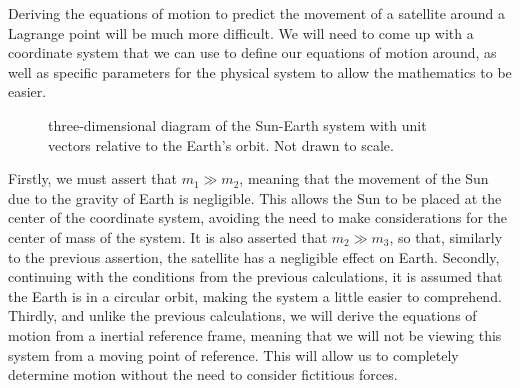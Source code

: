 \documentclass[12pt]{article}
\DeclareRobustCommand{\uvec}[1]{{%
		\ifcat\relax\noexpand#1%
		\bm{\hat{#1}}%
		\else
		\ifcsname uvec#1\endcsname
		\csname uvec#1\endcsname
		\else
		\bm{\hat{\mathbf{#1}}}%
		\fi
		\fi
}}
\newcommand{\bvec}[1]{\bm{\mathbf{#1}}}
\begin{document}
	Deriving the equations of motion to predict the movement of a satellite around a Lagrange point will be much more difficult.
	We will need to come up with a coordinate system that we can use to define our equations of motion around, as well as specific parameters for the physical system to allow the mathematics to be easier. \par
	\begin{figure}
		\centering
	\vspace*{0.25cm}
	\caption{three-dimensional diagram of the Sun-Earth system with unit vectors relative to the Earth's orbit. Not drawn to scale.}
	\label{fig:3d-coords}
	\end{figure}
	Firstly, we must assert that $m_1 \gg m_2$, meaning that the movement of the Sun due to the gravity of Earth is negligible.
	This allows the Sun to be placed at the center of the coordinate system, avoiding the need to make considerations for the center of mass of the system.
	It is also asserted that $m_2 \gg m_3$, so that, similarly to the previous assertion, the satellite has a negligible effect on Earth.
	Secondly, continuing with the conditions from the previous calculations, it is assumed that the Earth is in a circular orbit, making the system a little easier to comprehend.
	Thirdly, and unlike the previous calculations, we will derive the equations of motion from a inertial reference frame, meaning that we will not be viewing this system from a moving point of reference.
	This will allow us to completely determine motion without the need to consider fictitious forces.
	
\end{document}

